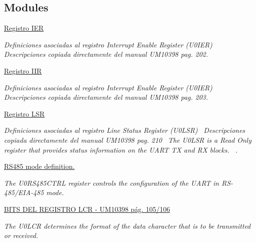 \subsection*{Modules}
\begin{DoxyCompactItemize}
\item 
\hyperlink{group___r_e_g_i_s_t_r_o___i_e_r}{Registro I\+ER}
\begin{DoxyCompactList}\small\item\em Definiciones asociadas al registro Interrupt Enable Register (U0\+I\+ER)~\newline
 Descripciones copiada directamente del manual U\+M10398 pag. 202. \end{DoxyCompactList}\item 
\hyperlink{group___r_e_g_i_s_t_r_o___i_i_r}{Registro I\+IR}
\begin{DoxyCompactList}\small\item\em Definiciones asociadas al registro Interrupt Enable Register (U0\+I\+ER)~\newline
 Descripciones copiada directamente del manual U\+M10398 pag. 203. \end{DoxyCompactList}\item 
\hyperlink{group___r_e_g_i_s_t_r_o___l_s_r}{Registro L\+SR}
\begin{DoxyCompactList}\small\item\em Definiciones asociadas al registro Line Status Register (U0\+L\+SR)~\newline
 Descripciones copiada directamente del manual U\+M10398 pag. 210~\newline
 The U0\+L\+SR is a Read Only register that provides status information on the U\+A\+RT TX and RX blocks.~\newline
. \end{DoxyCompactList}\item 
\hyperlink{group___r_s485_m_o_d_e}{R\+S485 mode definition.}
\begin{DoxyCompactList}\small\item\em The U0\+R\+S485\+C\+T\+RL register controls the configuration of the U\+A\+RT in R\+S-\/485/\+E\+I\+A-\/485 mode. \end{DoxyCompactList}\item 
\hyperlink{group___l_c_r_b_i_t_s}{B\+I\+T\+S D\+E\+L R\+E\+G\+I\+S\+T\+R\+O L\+C\+R -\/ U\+M10398 pág. 105/106}
\begin{DoxyCompactList}\small\item\em The U0\+L\+CR determines the format of the data character that is to be transmitted or received. \end{DoxyCompactList}\end{DoxyCompactItemize}
